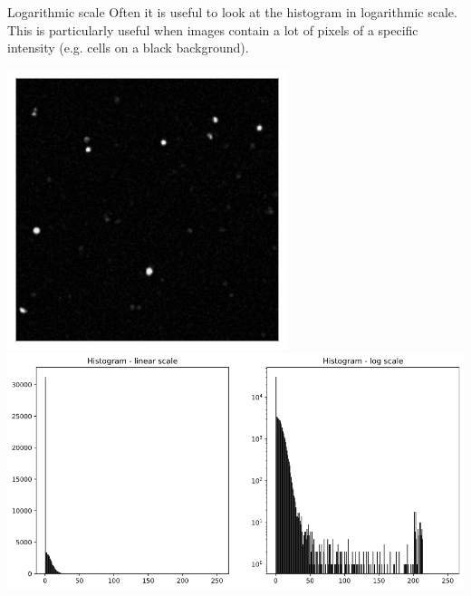 \documentclass[9pt, aspectratio=169]{beamer}
\begin{document}
\begin{frame}
    {Logarithmic scale}
    Often it is useful to look at the histogram in logarithmic scale. This is particularly useful when images contain a lot of pixels of a specific intensity (e.g. cells on a black background).

    \includegraphics[height=.5\textheight]{pit_cells.png}
    \includegraphics[height=.5\textheight]{pit_cells_histo_linear_vs_log.png}
\end{frame}
\end{document}
